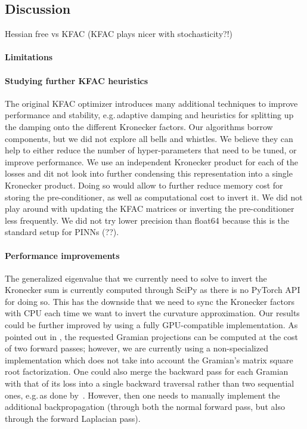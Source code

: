 \subsection{Discussion}

Hessian free vs KFAC (KFAC plays nicer with stochasticity?!)


\paragraph{Limitations}
\paragraph{Studying further KFAC heuristics} The original KFAC optimizer introduces many additional techniques to improve performance and stability, e.g.\,adaptive damping and heuristics for splitting up the damping onto the different Kronecker factors.
Our algorithms borrow components, but we did not explore all bells and whistles.
We believe they can help to either reduce the number of hyper-parameters that need to be tuned, or improve performance.
We use an independent Kronecker product for each of the losses and dit not look into further condensing this representation into a single Kronecker product.
Doing so would allow to further reduce memory cost for storing the pre-conditioner, as well as computational cost to invert it.
We did not play around with updating the KFAC matrices or inverting the pre-conditioner less frequently.
We did not try lower precision than float64 because this is the standard setup for PINNs (??).

\paragraph{Performance improvements} The generalized eigenvalue that we currently need to solve to invert the Kronecker sum is currently computed through SciPy as there is no PyTorch API for doing so. This has the downside that we need to sync the Kronecker factors with CPU each time we want to invert the curvature approximation. Our results could be further improved by using a fully GPU-compatible implementation.
As pointed out in \citep{martens2015optimizing}, the requested Gramian projections can be computed at the cost of two forward passes; however, we are currently using a non-specialized implementation which does not take into account the Gramian's matrix square root factorization.
One could also merge the backward pass for each Gramian with that of its loss into a single backward traversal rather than two sequential ones, e.g.\,as done by~\cite{dangel2020backpack}.
However, then one needs to manually implement the additional backpropagation (through both the normal forward pass, but also through the forward Laplacian pass).

